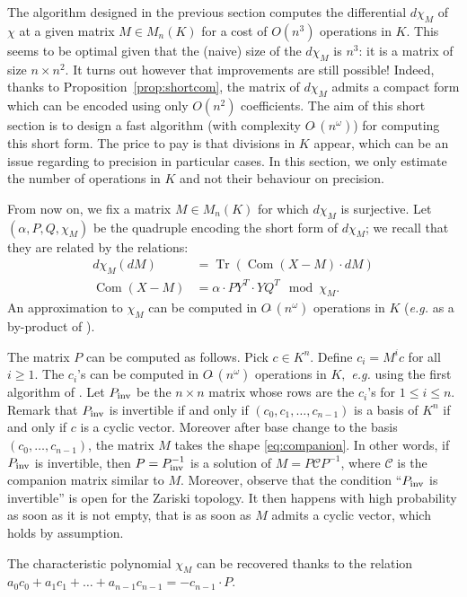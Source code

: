 \documentclass{sig-alternate-05-2015}
\DeclareMathOperator{\tr}{Tr}
\DeclareMathOperator{\com}{Com}
\newcommand{\softO}{O\tilde{~}}
\newcommand{\inv}{\text{\rm inv}}
\begin{document}
The algorithm designed in the previous section computes the differential 
$d \chi_M$ of $\chi$ at a given matrix $M \in M_n(K)$ for a cost of 
$O(n^3)$ operations in $K$. This seems to be optimal given that the 
(naive) size of the $d \chi_M$ is $n^3$: it is a matrix of size $n
\times n^2$. It turns out however that improvements are still possible!
Indeed, thanks to Proposition~\ref{prop:shortcom}, the matrix of 
$d \chi_M$ admits a compact form which can be encoded using only $O(n^2)$ 
coefficients. The aim of this short section is to design a fast 
algorithm (with complexity $\softO(n^\omega)$) for computing this short 
form. The price to pay is that divisions in $K$ appear, which can be an 
issue regarding to precision in particular cases.
In this section, we only estimate the number of operations in $K$
and not their behaviour on precision.

From now on, we fix a matrix $M \in M_n(K)$ for which $d \chi_M$ is 
surjective. Let $(\alpha, P, Q, \chi_M)$ be the quadruple encoding
the short form of $d \chi_M$; we recall that they are related by the
relations:
\begin{align*}
d \chi_M(dM) & =\tr(\com(X{-}M) \cdot dM) \\
\com(X{-}M) & = \alpha \cdot P Y^T \cdot Y Q^T \mod \chi_M.
\end{align*}
An approximation to $\chi_M$ can be computed in $\softO(n^\omega)$ operations in $K$
(\textit{e.g.} as a by-product of \cite{storjohann:01a}).

The matrix $P$ can be computed as follows. Pick $c \in K^n$. Define 
$c_i = M^i c$ for all $i \geq 1$. The $c_i$'s can be computed in 
$\softO(n^\omega)$ operations in $K,$ \textit{e.g.}
using the first algorithm
of \cite{keller-gehrig:85a}. Let $P_\inv$ be the 
$n \times n$ matrix whose rows are the $c_i$'s for $1 \leq i \leq n$. 
Remark that $P_\inv$ is invertible if and only if $(c_0, c_1, \ldots, 
c_{n-1})$ is a basis of $K^n$ if and only if $c$ is a cyclic vector. 
Moreover after base change to the basis $(c_0, \ldots, c_{n-1})$, the matrix 
$M$ takes the shape \eqref{eq:companion}. In other words, if $P_\inv$
is invertible, then $P = P_\inv^{-1}$ is a solution of $M = P \mathscr{C} P^{-1}$,
where $\mathscr{C}$ is the companion matrix similar to $M$.
Moreover, observe that the condition ``$P_\inv$ is invertible'' is open
for the Zariski topology. It then happens with high probability as soon
as it is not empty, that is as soon as $M$ admits a cyclic vector, which
holds by assumption.


The characteristic polynomial $\chi_M$ can be recovered thanks to the
relation $a_0c_0 + a_1c_1 + \dots + a_{n-1}c_{n-1} = -c_{n-1} \cdot P$.
\end{document}

